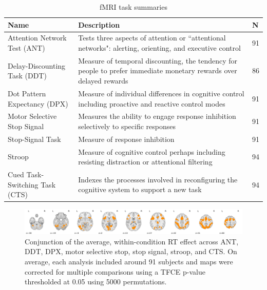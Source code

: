 \documentclass[titlepage,12pt] {article}
\begin{document}
\begin{table}[h!]
  \begin{center}
    \begin{tabular}{|L{6cm}|L{7cm}|L{1cm}|}\hline
   \textbf{Name} & \textbf{Description} & \textbf{N} \\ \hline\hline
   Attention Network Test (ANT) &  Tests three aspects of attention or  ``attentional networks": alerting, orienting, and executive control & 91 \\ \hline
    Delay-Discounting Task (DDT) & Measure of temporal discounting, the tendency for people to prefer immediate monetary rewards over delayed rewards & 86 \\ \hline
   Dot Pattern Expectancy (DPX) & Measure of individual differences in cognitive control including proactive and reactive control modes & 91 \\ \hline
   Motor Selective Stop Signal & Measures the ability to engage response inhibition selectively to specific responses & 91 \\ \hline
   Stop-Signal Task & Measure of response inhibition & 91 \\ \hline
   Stroop & Measure of cognitive control perhaps including resisting distraction or attentional filtering & 94 \\ \hline
   Cued Task-Switching Task (CTS) & Indexes the processes involved in reconfiguring the cognitive system to support a new task & 94 \\ \hline
    \end{tabular}
    \caption{fMRI task summaries}
    \label{tab:task_summaries}
   \end{center}
 \end{table}

\begin{figure}
  \centering
   \includegraphics[width=6.5in]{Figures/conjunction_avg_rt_effect_across_7tasks.pdf}
   \caption{Conjunction of the average, within-condition RT effect across ANT, DDT, DPX, motor selective stop, stop signal, stroop, and CTS.  On average, each analysis included around 91 subjects and maps were corrected for multiple comparisons using a TFCE p-value thresholded at 0.05 using 5000 permutations.}
  \label{fig:conj}
\end{figure}
\end{document}
